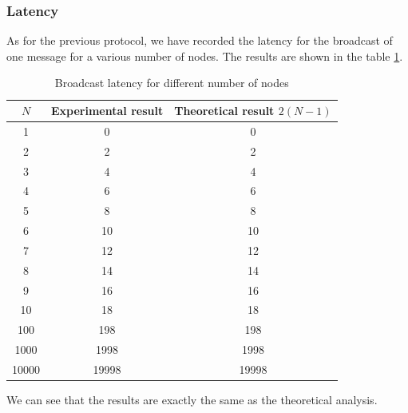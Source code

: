 \documentclass[a4paper]{article}
\begin{document}
\subsubsection*{Latency}
As for the previous protocol, we have recorded the latency for the broadcast of
one message for a various number of nodes. The results are shown in the table
\ref{table:th}.
\begin{table}[H]
\centering
\begin{tabular}{|c|c|c|}
    \hline
    $N$  & Experimental result & Theoretical result $2(N-1)$ \\
    \hline
    1     & 0   & 0    \\
    2     & 2   & 2   \\
    3     & 4   & 4   \\
    4     & 6   & 6   \\
    5     & 8   & 8   \\
    6     & 10  & 10  \\
    7     & 12  & 12  \\
    8     & 14  & 14  \\
    9     & 16  & 16  \\
    10    & 18  & 18  \\
    100   & 198 & 198  \\
    1000  & 1998   & 1998  \\
    10000 & 19998   & 19998  \\
    \hline
\end{tabular}
\caption{Broadcast latency for different number of nodes}
\label{table:th}
\end{table}
We can see that the results are exactly the same as the theoretical analysis.
\end{document}
